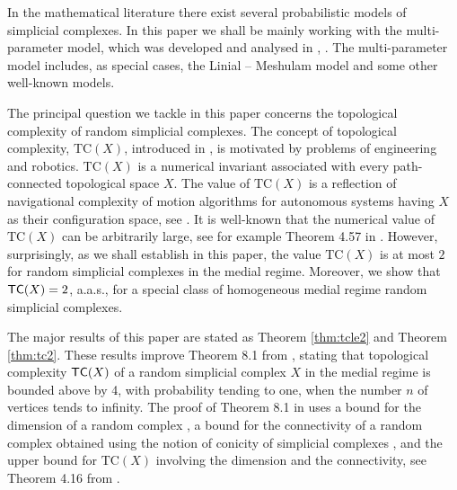 \documentclass[11pt,twoside, reqno]{amsart}
\theoremstyle{plain}
\theoremstyle{definition}
\newcommand{\TC}{\textrm{TC}}
\newcommand{\tc}{{\sf{TC}}}
\begin{document}
In the mathematical literature there exist several probabilistic models of simplicial complexes. 
In this paper we shall be mainly working with the multi-parameter model, which was developed and 
analysed in \cite{CF}, \cite{FMN}. The multi-parameter model includes, as special cases, the Linial -- Meshulam model \cite{LM} and some other well-known models.

The principal question we tackle in this paper concerns the topological complexity of random simplicial complexes. 
The concept
of topological complexity,  $\TC(X)$,
 introduced in \cite{Far0}, is motivated by problems of engineering and robotics. $\TC(X)$ is a numerical invariant associated with every path-connected topological space $X$. 
 The value of $\TC(X)$ is
 a reflection of navigational complexity of motion algorithms for autonomous systems having $X$ as their configuration space, see \cite{Far0}. 
It is well-known that the numerical value of $\TC(X)$ can be arbitrarily large, see for example Theorem 4.57 in \cite{Far2}. However, surprisingly, as we shall establish in this paper, the value $\TC(X)$ is at most $2$ for random simplicial complexes in the medial regime. Moreover, we show that $\tc(X)=2$, a.a.s., for a special class of homogeneous medial regime random simplicial complexes. 


The major results of this paper are stated as Theorem \ref{thm:tcle2} and Theorem \ref{thm:tc2}. 
These results improve Theorem 8.1 from \cite{Far}, stating that topological complexity $\tc(X)$ of a random simplicial complex $X$ in the medial regime is bounded above by 4, with probability tending to one, when the number $n$ of vertices tends to infinity. 
The proof of Theorem 8.1 in \cite{Far} uses a bound for the dimension of a random complex \cite{FM}, a bound for the connectivity of a random complex obtained using the notion of conicity of simplicial complexes \cite{Bar, Bar2}, and the upper bound for $\TC(X)$ involving the dimension and the connectivity, see Theorem 4.16 from \cite{Far2}. 

\end{document}
